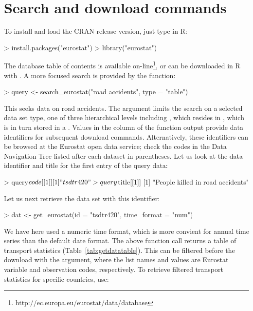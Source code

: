 \section{Search and download commands}

To install and load the CRAN release version, just type in R:

\begin{example}
> install.packages("eurostat")
> library("eurostat")
\end{example}

The database table of contents is available
on-line\footnote{http://ec.europa.eu/eurostat/data/database}, or can
be downloaded in R with . A more focused
search is provided by the  function:

\begin{example}
> query <- search_eurostat("road accidents", type = "table")
\end{example}

This seeks data on road accidents. The  argument limits the
search on a selected data set type, one of three hierarchical levels
including
, which resides in , which is in turn stored in a . Values in the  column of the 
function output provide data identifiers for subsequent download
commands. Alternatively, these identifiers can be browsed at the
Eurostat open data service; check the codes in the Data Navigation
Tree listed after each dataset in parentheses. Let us look at the data
identifier and title for the first entry of the query data:

\begin{example}
> query$code[[1]]
[1] "tsdtr420"

> query$title[[1]]
[1] "People killed in road accidents"
\end{example}


Let us next retrieve the data set with this identifier:

\begin{example}
> dat <- get_eurostat(id = "tsdtr420", time_format = "num")
\end{example}

We have here used a numeric time format, which is more convient for
annual time series than the default date format. The above function
call returns a table of transport statistics
(Table~\ref{tab:getdatatable}). This can be filtered before the
download with the  argument, where the list names and
values are Eurostat variable and observation codes, respectively. To
retrieve filtered transport statistics for specific countries, use:

